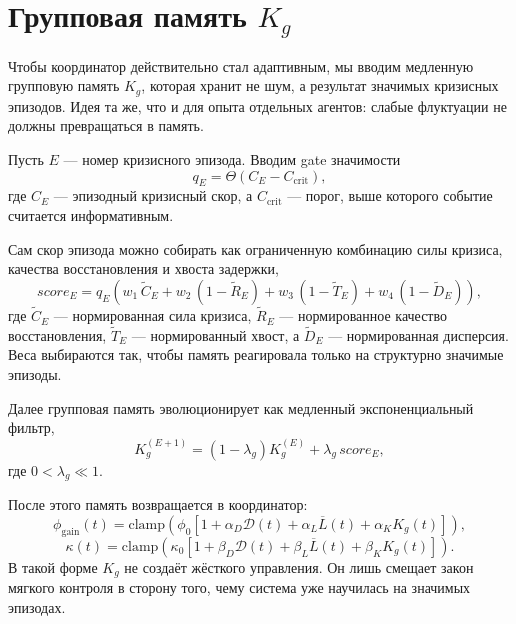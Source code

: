 \section{Групповая память $K_g$}
Чтобы координатор действительно стал адаптивным, мы вводим медленную групповую память $K_g$, которая хранит не шум, а результат значимых кризисных эпизодов. Идея та же, что и для опыта отдельных агентов: слабые флуктуации не должны превращаться в память.

Пусть $E$ — номер кризисного эпизода. Вводим gate значимости
\begin{equation}
q_E = \Theta(C_E - C_{\mathrm{crit}}),
\end{equation}
где $C_E$ — эпизодный кризисный скор, а $C_{\mathrm{crit}}$ — порог, выше которого событие считается информативным.

Сам скор эпизода можно собирать как ограниченную комбинацию силы кризиса, качества восстановления и хвоста задержки,
\begin{equation}
score_E = q_E \left(
w_1\,\tilde C_E
+w_2\,(1-\tilde R_E)
+w_3\,(1-\tilde T_E)
+w_4\,(1-\tilde D_E)
\right),
\end{equation}
где $\tilde C_E$ — нормированная сила кризиса, $\tilde R_E$ — нормированное качество восстановления, $\tilde T_E$ — нормированный хвост, а $\tilde D_E$ — нормированная дисперсия. Веса выбираются так, чтобы память реагировала только на структурно значимые эпизоды.

Далее групповая память эволюционирует как медленный экспоненциальный фильтр,
\begin{equation}
K_g^{(E+1)} = (1-\lambda_g)K_g^{(E)} + \lambda_g\,score_E,
\end{equation}
где $0<\lambda_g\ll 1$.

После этого память возвращается в координатор:
\begin{equation}
\phi_{\mathrm{gain}}(t)=\mathrm{clamp}\!\left(
\phi_0\left[1+\alpha_D\mathcal{D}(t)+\alpha_L\overline{L}(t)+\alpha_K K_g(t)\right]
\right),
\end{equation}
\begin{equation}
\kappa(t)=\mathrm{clamp}\!\left(
\kappa_0\left[1+\beta_D\mathcal{D}(t)+\beta_L\overline{L}(t)+\beta_K K_g(t)\right]
\right).
\end{equation}
В такой форме $K_g$ не создаёт жёсткого управления. Он лишь смещает закон мягкого контроля в сторону того, чему система уже научилась на значимых эпизодах.
